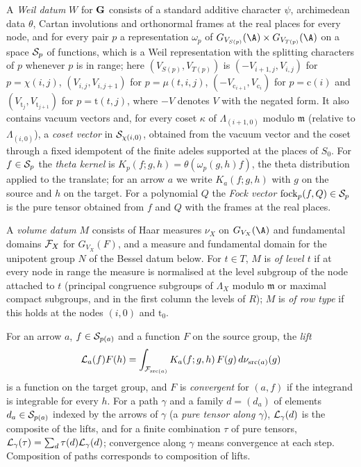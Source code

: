 \begin{definition}\label{def:pf:rowprops:weil}
A \emph{Weil datum} $W$ for $\mathbf{G}$ consists of a standard additive character $\psi$, archimedean data $\theta$,
Cartan involutions and orthonormal frames at the real places for every node, and for every pair $p$ a representation
$\omega_p$ of $G_{V_{S(p)}}(\A)\times G_{V_{T(p)}}(\A)$ on a space $\mathcal{S}_p$ of functions, which is a Weil
representation with the splitting characters of $p$ whenever $p$ is in range; here
$(V_{S(p)},V_{T(p)})$ is $(-V_{i+1,j},V_{i,j})$ for $p=\chi(i,j)$, $(V_{i,j},V_{i,j+1})$ for $p=\mu(t,i,j)$,
$(-V_{\mathrm c_{i+1}},V_{\mathrm c_i})$ for $p=\mathrm c(i)$ and $(V_{\mathrm t_j},V_{\mathrm t_{j+1}})$ for
$p=\mathrm t(t,j)$, where $-V$ denotes $V$ with the negated form. It also contains vacuum vectors and, for every coset
$\kappa$ of $\Lambda_{(i+1,0)}$ modulo $\mathfrak m$ (relative to $\Lambda_{(i,0)}$), a \emph{coset vector} in
$\mathcal{S}_{\chi(i,0)}$, obtained from the vacuum vector and the coset through a fixed idempotent of the finite adeles
supported at the places of $S_0$. For $f\in\mathcal{S}_p$ the
\emph{theta kernel} is $K_p(f;g,h)=\theta(\omega_p(g,h)f)$, the theta distribution applied to the translate; for an
arrow $a$ we write $K_a(f;g,h)$ with $g$ on the source and $h$ on the target. For a polynomial $Q$ the \emph{Fock vector}
$\mathrm{fock}_p(f,Q)\in\mathcal{S}_p$ is the pure tensor obtained from $f$ and $Q$ with the frames at the real places.

A \emph{volume datum} $M$ consists of Haar measures $\nu_X$ on $G_{V_X}(\A)$ and fundamental domains $\mathcal{F}_X$ for
$G_{V_X}(F)$, and a measure and fundamental domain for the unipotent group $N$ of the Bessel datum below. For
$t\in T$, $M$ is \emph{of level $t$} if at every node in range the measure is normalised at the level subgroup of the
node attached to $t$ (principal congruence subgroups of $\Lambda_X$ modulo $\mathfrak m$ or maximal compact
subgroups, and in the first column the levels of $R$); $M$ is \emph{of row type} if this holds at the nodes
$(i,0)$ and $\mathrm t_0$.

For an arrow $a$, $f\in\mathcal{S}_{p(a)}$ and a function $F$ on the source group, the \emph{lift}
\[
\mathcal{L}_a(f)F(h)=\int_{\mathcal{F}_{\mathrm{src}(a)}}K_a(f;g,h)\,F(g)\,d\nu_{\mathrm{src}(a)}(g)
\]
is a function on the target group, and $F$ is \emph{convergent} for $(a,f)$ if the integrand is integrable for every
$h$. For a path $\gamma$ and a family $d=(d_a)$ of elements $d_a\in\mathcal{S}_{p(a)}$ indexed by the arrows of $\gamma$
(a \emph{pure tensor along $\gamma$}), $\mathcal{L}_\gamma(d)$ is the composite of the lifts, and for a finite
combination $\tau$ of pure tensors, $\mathcal{L}_\gamma(\tau)=\sum_d\tau(d)\mathcal{L}_\gamma(d)$; convergence along
$\gamma$ means convergence at each step. Composition of paths corresponds to composition of lifts.
\end{definition}

